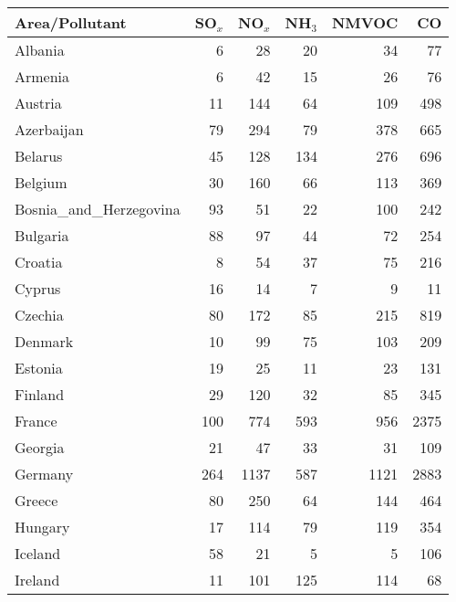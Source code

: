 \begin{table}
\begin{center}
\scriptsize
\begin{tabular}{|l|r|r|r|r|r|}
\hline
 Area/Pollutant&SO$_x$&NO$_x$&NH$_3$&NMVOC&CO\\\hline\hline
                       Albania&     6&    28&    20&    34&    77 \\\hline
                       Armenia&     6&    42&    15&    26&    76 \\\hline
                       Austria&    11&   144&    64&   109&   498 \\\hline
                    Azerbaijan&    79&   294&    79&   378&   665 \\\hline
                       Belarus&    45&   128&   134&   276&   696 \\\hline
                       Belgium&    30&   160&    66&   113&   369 \\\hline
        Bosnia_and_Herzegovina&    93&    51&    22&   100&   242 \\\hline
                      Bulgaria&    88&    97&    44&    72&   254 \\\hline
                       Croatia&     8&    54&    37&    75&   216 \\\hline
                        Cyprus&    16&    14&     7&     9&    11 \\\hline
                       Czechia&    80&   172&    85&   215&   819 \\\hline
                       Denmark&    10&    99&    75&   103&   209 \\\hline
                       Estonia&    19&    25&    11&    23&   131 \\\hline
                       Finland&    29&   120&    32&    85&   345 \\\hline
                        France&   100&   774&   593&   956&  2375 \\\hline
                       Georgia&    21&    47&    33&    31&   109 \\\hline
                       Germany&   264&  1137&   587&  1121&  2883 \\\hline
                        Greece&    80&   250&    64&   144&   464 \\\hline
                       Hungary&    17&   114&    79&   119&   354 \\\hline
                       Iceland&    58&    21&     5&     5&   106 \\\hline
                       Ireland&    11&   101&   125&   114&    68 \\\hline

\end{tabular}
\end{center}
\end{table}
